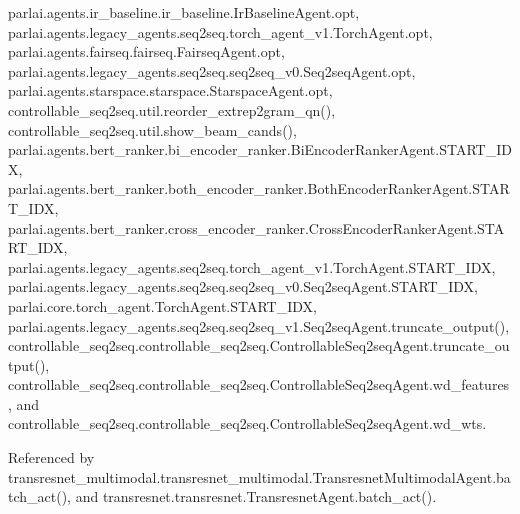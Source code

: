 parlai.\+agents.\+ir\+\_\+baseline.\+ir\+\_\+baseline.\+Ir\+Baseline\+Agent.\+opt, parlai.\+agents.\+legacy\+\_\+agents.\+seq2seq.\+torch\+\_\+agent\+\_\+v1.\+Torch\+Agent.\+opt, parlai.\+agents.\+fairseq.\+fairseq.\+Fairseq\+Agent.\+opt, parlai.\+agents.\+legacy\+\_\+agents.\+seq2seq.\+seq2seq\+\_\+v0.\+Seq2seq\+Agent.\+opt, parlai.\+agents.\+starspace.\+starspace.\+Starspace\+Agent.\+opt, controllable\+\_\+seq2seq.\+util.\+reorder\+\_\+extrep2gram\+\_\+qn(), controllable\+\_\+seq2seq.\+util.\+show\+\_\+beam\+\_\+cands(), parlai.\+agents.\+bert\+\_\+ranker.\+bi\+\_\+encoder\+\_\+ranker.\+Bi\+Encoder\+Ranker\+Agent.\+S\+T\+A\+R\+T\+\_\+\+I\+DX, parlai.\+agents.\+bert\+\_\+ranker.\+both\+\_\+encoder\+\_\+ranker.\+Both\+Encoder\+Ranker\+Agent.\+S\+T\+A\+R\+T\+\_\+\+I\+DX, parlai.\+agents.\+bert\+\_\+ranker.\+cross\+\_\+encoder\+\_\+ranker.\+Cross\+Encoder\+Ranker\+Agent.\+S\+T\+A\+R\+T\+\_\+\+I\+DX, parlai.\+agents.\+legacy\+\_\+agents.\+seq2seq.\+torch\+\_\+agent\+\_\+v1.\+Torch\+Agent.\+S\+T\+A\+R\+T\+\_\+\+I\+DX, parlai.\+agents.\+legacy\+\_\+agents.\+seq2seq.\+seq2seq\+\_\+v0.\+Seq2seq\+Agent.\+S\+T\+A\+R\+T\+\_\+\+I\+DX, parlai.\+core.\+torch\+\_\+agent.\+Torch\+Agent.\+S\+T\+A\+R\+T\+\_\+\+I\+DX, parlai.\+agents.\+legacy\+\_\+agents.\+seq2seq.\+seq2seq\+\_\+v1.\+Seq2seq\+Agent.\+truncate\+\_\+output(), controllable\+\_\+seq2seq.\+controllable\+\_\+seq2seq.\+Controllable\+Seq2seq\+Agent.\+truncate\+\_\+output(), controllable\+\_\+seq2seq.\+controllable\+\_\+seq2seq.\+Controllable\+Seq2seq\+Agent.\+wd\+\_\+features, and controllable\+\_\+seq2seq.\+controllable\+\_\+seq2seq.\+Controllable\+Seq2seq\+Agent.\+wd\+\_\+wts.



Referenced by transresnet\+\_\+multimodal.\+transresnet\+\_\+multimodal.\+Transresnet\+Multimodal\+Agent.\+batch\+\_\+act(), and transresnet.\+transresnet.\+Transresnet\+Agent.\+batch\+\_\+act().

